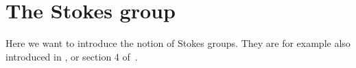 \begin{comment}
      \textbf{``\Leftarrow{}'':}
      If for some suitable covering $(I_j)$ the cocycle $(\lambda_{jl})$ is a
      coboundary with values in $\Aut_\cA(\tilde\cM^{nf})$, i.e.\
      $\lambda_{jl}=f_lf_j^{-1}$, we define a new connection $\nabla$ on
      $\tilde\cM^{nf}$ by conjugating $\nabla^{nf}$ by $f_j$ on $U_j$.

      \TODO{}

      Moreover $\hat f_j=\hat f_l$ on $U_j\cap U_l$, so that the formal
      isomorphisms
      \[
        \hat f_j:(\hat \cM^{nf},\nabla)
        \overset{\sim}{\longrightarrow}
        (\hat\cM^{nf},\nabla^{nf})
      \]
      can be glued in an isomorphism $\hat f:(\hat \cM^{nf},\nabla)
      \overset{\sim}{\longrightarrow}(\hat\cM^{nf},\nabla^{nf})$.
    \end{proof}

    Thus, the proof of~\ref{thm:mainThm1} is a consequence of the following
    theorem by Malgrange and Sibuya.
    \begin{thm}[Malgrange-Sibuya]\label{thm:malgSibuyaHelp}
      \marginnote{\cite[Thm.II.6.10]{sabbah2007isomonodromic}}
      The image of the mapping
      \[
        H^1(S^1;\Gl_d^{<0}(\cA_{\tilde D}))
        \to
        H^1(S^1;\Gl_d(\cA_{\tilde D}))
      \]
      is the identity.
    \end{thm}
    For the proof of Theorem~\ref{thm:malgSibuyaHelp} which we refer to
    \cite[Th.A.1]{Malgrange1983}, \cite[Th.6.4.1]{sibuya1990Linear} and
    \cite{babbitt1989local}.
  \end{proof}
\end{comment}
\fi

\section{The Stokes group}\label{sec:StokesGroup}
\PROBLEM[rewrite!]
Here we want to introduce the notion of Stokes groups. They are for example
also introduced in \cite{Loday1994}, \cite{Loday2014} or section 4
of~\cite{Martinet1991}.
